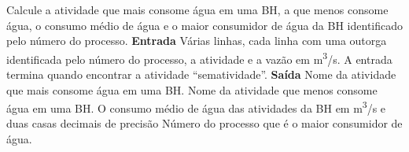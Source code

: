 \documentclass[a4paper, 12pt]{article}
\begin{document}
Calcule a atividade que mais consome água em uma BH, a que menos consome água, o consumo médio de água e o maior consumidor de água da BH identificado pelo número do processo.
\newline \newline
\textbf{{\large Entrada}} \newline
Várias linhas, cada linha com uma outorga identificada pelo número do processo, a atividade e a vazão em m\textsuperscript{3}/s. \newline
A entrada termina quando encontrar a atividade “sem\textunderscore atividade”.
\newline \newline
\textbf{{\large Saída}} \newline
Nome da atividade que mais consome água em uma BH. \newline
Nome da atividade que menos consome água em uma BH. \newline
O consumo médio de água das atividades da BH em m\textsuperscript{3}/s e duas casas decimais de precisão
Número do processo que é o maior consumidor de água.
\newline \newline
\newline
\end{document}
